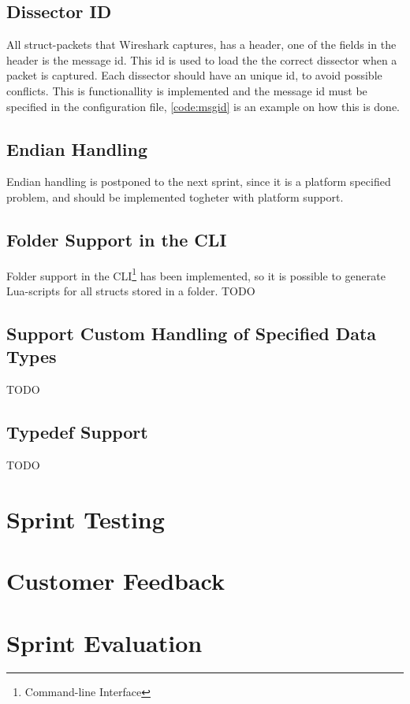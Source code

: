 \subsection{Dissector ID}
All struct-packets that Wireshark captures, has a header, one of the fields in 
the header is the message id. This id is used to load the the correct 
dissector when a packet is captured. Each dissector should have an unique id, 
to avoid possible conflicts. This is functionallity is implemented and the 
message id must be specified in the configuration file, \autoref{code:msgid} 
is an example on how this is done.



\subsection{Endian Handling}
Endian handling is postponed to the next sprint, since it is a platform 
specified problem, and should be implemented togheter with platform support.

\subsection{Folder Support in the CLI}
Folder support in the CLI\footnote{Command-line Interface} has been implemented, so it is possible to generate Lua-scripts for all structs stored in a folder.
TODO

\subsection{Support Custom Handling of Specified Data Types}
TODO

\subsection{Typedef Support}
TODO




\section{Sprint Testing}


\section{Customer Feedback}


\section{Sprint Evaluation}



